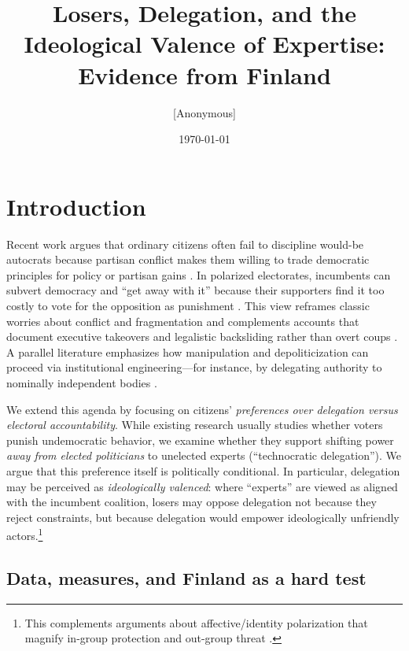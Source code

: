 \title{Losers, Delegation, and the Ideological Valence of Expertise: \\ Evidence from Finland}
\author{[Anonymous]}
\date{\today}


\section{Introduction}

Recent work argues that ordinary citizens often fail to discipline would-be autocrats because partisan conflict makes them willing to trade democratic principles for policy or partisan gains \citep{Svolik2020QJPS, Svolik2019JoD}. In polarized electorates, incumbents can subvert democracy and “get away with it” because their supporters find it too costly to vote for the opposition as punishment \citep{Svolik2020QJPS}. This view reframes classic worries about conflict and fragmentation \citep{Lipset1960, Dahl1971, Sartori1976} and complements accounts that document executive takeovers and legalistic backsliding rather than overt coups \citep{LevitskyWay2010, Bermeo2016, WaldnerLust2018}. A parallel literature emphasizes how manipulation and depoliticization can proceed via institutional engineering---for instance, by delegating authority to nominally independent bodies \citep{Schedler2002, Singer2018}.

We extend this agenda by focusing on citizens’ \emph{preferences over delegation versus electoral accountability}. While existing research usually studies whether voters punish undemocratic behavior, we examine whether they support shifting power \emph{away from elected politicians} to unelected experts (“technocratic delegation”). We argue that this preference itself is politically conditional. In particular, delegation may be perceived as \emph{ideologically valenced}: where “experts” are viewed as aligned with the incumbent coalition, losers may oppose delegation not because they reject constraints, but because delegation would empower ideologically unfriendly actors.\footnote{This complements arguments about affective/identity polarization that magnify in-group protection and out-group threat \citep[e.g.,][]{LevitskyZiblatt2018, McCoySomer2018}.}

\subsection*{Data, measures, and Finland as a hard test}

